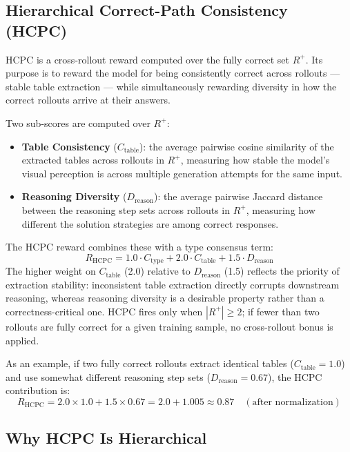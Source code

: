 \documentclass{iutbscthesis}
\begin{document}
\subsection{Hierarchical Correct-Path Consistency (HCPC)}

HCPC is a cross-rollout reward computed over the fully correct set $R^+$. Its purpose is to reward the model for being consistently correct across rollouts --- stable table extraction --- while simultaneously rewarding diversity in how the correct rollouts arrive at their answers.

Two sub-scores are computed over $R^+$:
\begin{itemize}
    \item \textbf{Table Consistency} ($C_{\text{table}}$): the average pairwise cosine similarity of the extracted tables across rollouts in $R^+$, measuring how stable the model's visual perception is across multiple generation attempts for the same input.
    \item \textbf{Reasoning Diversity} ($D_{\text{reason}}$): the average pairwise Jaccard distance between the reasoning step sets across rollouts in $R^+$, measuring how different the solution strategies are among correct responses.
\end{itemize}
The HCPC reward combines these with a type consensus term:
\begin{equation}
    R_{\text{HCPC}} = 1.0 \cdot C_{\text{type}} + 2.0 \cdot C_{\text{table}} + 1.5 \cdot D_{\text{reason}}
\end{equation}
The higher weight on $C_{\text{table}}$ (2.0) relative to $D_{\text{reason}}$ (1.5) reflects the priority of extraction stability: inconsistent table extraction directly corrupts downstream reasoning, whereas reasoning diversity is a desirable property rather than a correctness-critical one. HCPC fires only when $|R^+| \geq 2$; if fewer than two rollouts are fully correct for a given training sample, no cross-rollout bonus is applied.

As an example, if two fully correct rollouts extract identical tables ($C_{\text{table}} = 1.0$) and use somewhat different reasoning step sets ($D_{\text{reason}} = 0.67$), the HCPC contribution is:
\begin{equation}
    R_{\text{HCPC}} = 2.0 \times 1.0 + 1.5 \times 0.67 = 2.0 + 1.005 \approx 0.87 \quad (\text{after normalization})
\end{equation}

\subsection{Why HCPC Is Hierarchical}
\end{document}
